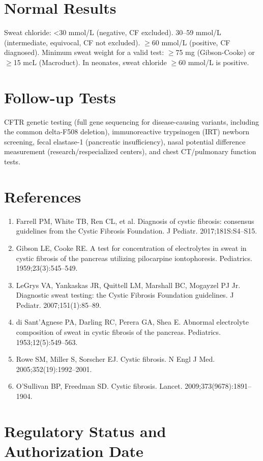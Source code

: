 \section*{Normal Results}
Sweat chloride: <30 mmol/L (negative, CF excluded). 30--59 mmol/L (intermediate, equivocal, CF not excluded). $\geq$60 mmol/L (positive, CF diagnosed). Minimum sweat weight for a valid test: $\geq$75 mg (Gibson-Cooke) or $\geq$15 mcL (Macroduct). In neonates, sweat chloride $\geq$60 mmol/L is positive.
\section*{Follow-up Tests}
CFTR genetic testing (full gene sequencing for disease-causing variants, including the common delta-F508 deletion), immunoreactive trypsinogen (IRT) newborn screening, fecal elastase-1 (pancreatic insufficiency), nasal potential difference measurement (research/respecialized centers), and chest CT/pulmonary function tests.
\section*{References}
\begin{enumerate}
  \item Farrell PM, White TB, Ren CL, et al. Diagnosis of cystic fibrosis: consensus guidelines from the Cystic Fibrosis Foundation. J Pediatr. 2017;181S:S4--S15.
  \item Gibson LE, Cooke RE. A test for concentration of electrolytes in sweat in cystic fibrosis of the pancreas utilizing pilocarpine iontophoresis. Pediatrics. 1959;23(3):545--549.
  \item LeGrys VA, Yankaskas JR, Quittell LM, Marshall BC, Mogayzel PJ Jr. Diagnostic sweat testing: the Cystic Fibrosis Foundation guidelines. J Pediatr. 2007;151(1):85--89.
  \item di Sant'Agnese PA, Darling RC, Perera GA, Shea E. Abnormal electrolyte composition of sweat in cystic fibrosis of the pancreas. Pediatrics. 1953;12(5):549--563.
  \item Rowe SM, Miller S, Sorscher EJ. Cystic fibrosis. N Engl J Med. 2005;352(19):1992--2001.
  \item O'Sullivan BP, Freedman SD. Cystic fibrosis. Lancet. 2009;373(9678):1891--1904.
\end{enumerate}
\clearpage
\section*{Regulatory Status and Authorization Date}

\clearpage
